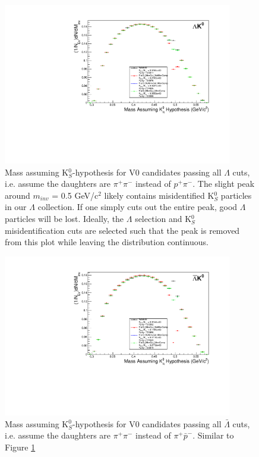 \begin{figure}[h]
  \centering
  \includegraphics[width=100mm]{3_DataSelection/Figures/MassAssHypotheses/canMassAssK0HypCompare_LamK0_wNoMisID.pdf}
  \caption[K$^{0}_{S}$ contamination in $\Lambda$ collection]{Mass assuming K$^{0}_{S}$-hypothesis for V0 candidates passing all $\Lambda$ cuts, i.e. assume the daughters are $\pi^{+}\pi^{-}$ instead of $p^{+}\pi^{-}$.  The slight peak around $m_{inv}$ = 0.5 GeV/c$^{2}$ likely contains misidentified K$^{0}_{S}$ particles in our $\Lambda$ collection.  If one simply cuts out the entire peak, good $\Lambda$ particles will be lost.  Ideally, the $\Lambda$ selection and K$^{0}_{S}$ misidentification cuts are selected such that the peak is removed from this plot while leaving the distribution continuous.}
  \label{fig:MassAssK0ShortHyp_LamK0}
\end{figure}

\begin{figure}[h]
  \centering
  \includegraphics[width=100mm]{3_DataSelection/Figures/MassAssHypotheses/canMassAssK0HypCompare_ALamK0_wNoMisID.pdf}
  \caption[K$^{0}_{S}$ contamination in $\bar{\Lambda}$ collection]{Mass assuming K$^{0}_{S}$-hypothesis for V0 candidates passing all $\bar{\Lambda}$ cuts, i.e. assume the daughters are $\pi^{+}\pi^{-}$ instead of $\pi^{+}\bar{p}^{-}$.  Similar to Figure \ref{fig:MassAssK0ShortHyp_LamK0}}
  \label{fig:MassAssK0ShortHyp_ALamK0}
\end{figure}

